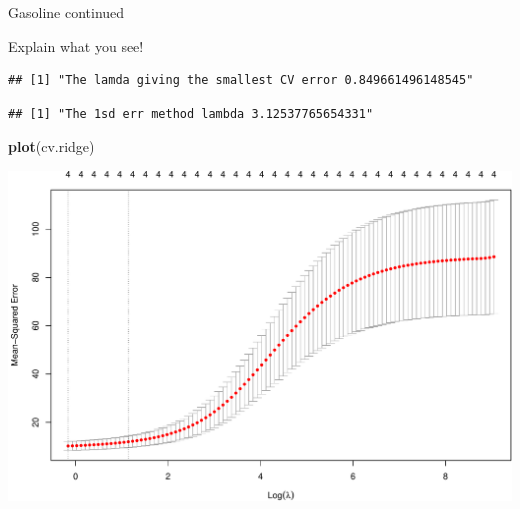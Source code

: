 \documentclass[
  ignorenonframetext,
]{beamer}
\newenvironment{Shaded}{\begin{snugshade}}{\end{snugshade}}
\newcommand{\DataTypeTok}[1]{\textcolor[rgb]{0.13,0.29,0.53}{#1}}
\newcommand{\DecValTok}[1]{\textcolor[rgb]{0.00,0.00,0.81}{#1}}
\newcommand{\FloatTok}[1]{\textcolor[rgb]{0.00,0.00,0.81}{#1}}
\newcommand{\KeywordTok}[1]{\textcolor[rgb]{0.13,0.29,0.53}{\textbf{#1}}}
\newcommand{\NormalTok}[1]{#1}
\newcommand{\OperatorTok}[1]{\textcolor[rgb]{0.81,0.36,0.00}{\textbf{#1}}}
\newcommand{\StringTok}[1]{\textcolor[rgb]{0.31,0.60,0.02}{#1}}
\begin{document}
\begin{frame}[fragile]

\begin{block}{Gasoline continued}

Explain what you see!

\begin{Shaded}
\end{Shaded}

\begin{verbatim}
## [1] "The lamda giving the smallest CV error 0.849661496148545"
\end{verbatim}

\begin{Shaded}
\end{Shaded}

\begin{verbatim}
## [1] "The 1sd err method lambda 3.12537765654331"
\end{verbatim}

\begin{Shaded}
\begin{Highlighting}[]
\KeywordTok{plot}\NormalTok{(cv.ridge)}
\end{Highlighting}
\end{Shaded}

\includegraphics{L2_files/figure-beamer/unnamed-chunk-10-1.pdf}


\end{block}
\end{frame}
\end{document}

